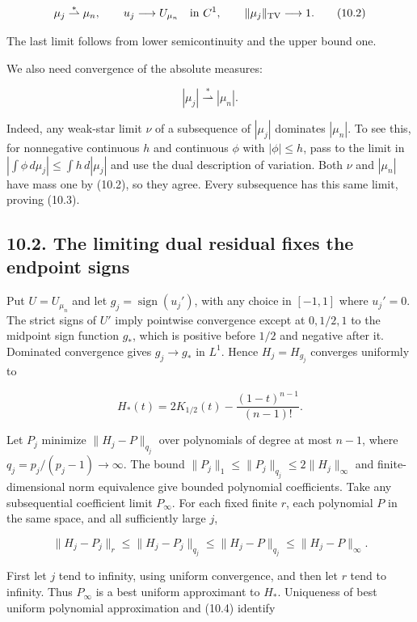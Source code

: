 \documentclass[11pt]{article}
\begin{document}
\[
\mu_j\stackrel{*}{\rightharpoonup}\mu_n,\qquad
u_j\longrightarrow U_{\mu_n}\quad\hbox{in }C^1,
\qquad \|\mu_j\|_{\mathrm{TV}}\longrightarrow1.
\tag{10.2}
\]

The last limit follows from lower semicontinuity and the upper bound
one.

We also need convergence of the absolute measures:

\[
|\mu_j|\stackrel{*}{\rightharpoonup}|\mu_n|.
\tag{10.3}
\]

Indeed, any weak-star limit \(\nu\) of a subsequence of \(|\mu_j|\)
dominates \(|\mu_n|\). To see this, for nonnegative continuous \(h\) and
continuous \(\phi\) with \(|\phi|\le h\), pass to the limit in
\(|\int\phi\,d\mu_j|\le\int h\,d|\mu_j|\) and use the dual description
of variation. Both \(\nu\) and \(|\mu_n|\) have mass one by (10.2), so
they agree. Every subsequence has this same limit, proving (10.3).

\subsection{10.2. The limiting dual residual fixes the endpoint
signs}\label{the-limiting-dual-residual-fixes-the-endpoint-signs}

Put \(U=U_{\mu_n}\) and let \(g_j=\operatorname{sign}(u_j')\), with any
choice in \([-1,1]\) where \(u_j'=0\). The strict signs of \(U'\) imply
pointwise convergence except at \(0,1/2,1\) to the midpoint sign
function \(g_*\), which is positive before \(1/2\) and negative after
it. Dominated convergence gives \(g_j\to g_*\) in \(L^1\). Hence
\(H_j=H_{g_j}\) converges uniformly to

\[
H_*(t)=2K_{1/2}(t)-\frac{(1-t)^{n-1}}{(n-1)!}.
\tag{10.4}
\]

Let \(P_j\) minimize \(\|H_j-P\|_{q_j}\) over polynomials of degree at
most \(n-1\), where \(q_j=p_j/(p_j-1)\to\infty\). The bound
\(\|P_j\|_1\le\|P_j\|_{q_j}\le2\|H_j\|_\infty\) and finite-dimensional
norm equivalence give bounded polynomial coefficients. Take any
subsequential coefficient limit \(P_\infty\). For each fixed finite
\(r\), each polynomial \(P\) in the same space, and all sufficiently
large \(j\),

\[
\|H_j-P_j\|_r\le\|H_j-P_j\|_{q_j}
\le\|H_j-P\|_{q_j}\le\|H_j-P\|_\infty.
\tag{10.5}
\]

First let \(j\) tend to infinity, using uniform convergence, and then
let \(r\) tend to infinity. Thus \(P_\infty\) is a best uniform
approximant to \(H_*\). Uniqueness of best uniform polynomial
approximation and (10.4) identify
\end{document}
